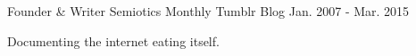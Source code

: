 

\begin{cventries}

  \cventry
    {Founder \& Writer} %
    {Semiotics Monthly} %
    {Tumblr Blog} %
    {Jan. 2007 - Mar. 2015} %
    {
      \begin{cvitems} %
        \item {Documenting the internet eating itself.}
      \end{cvitems}
    }

\end{cventries}
